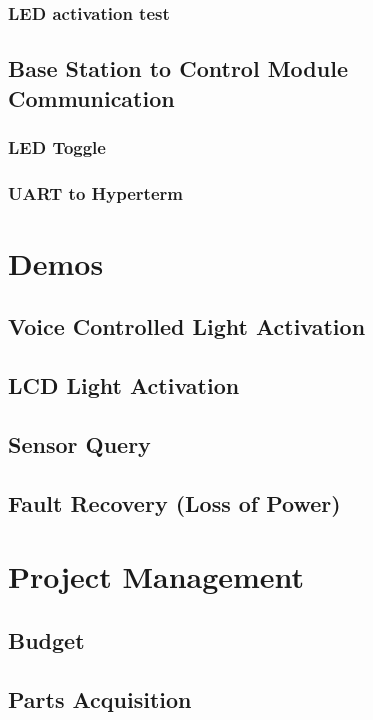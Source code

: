   \subsubsection{LED activation test}
\lipsum[1]
 \subsection{Base Station to Control Module Communication}
\lipsum[1]
  \subsubsection{LED Toggle}
\lipsum[1]
  \subsubsection{UART to Hyperterm}
\lipsum[1]
\section{Demos}
\lipsum[1]
 \subsection{Voice Controlled Light Activation}
\lipsum[1]
 \subsection{LCD Light Activation}
\lipsum[1]
 \subsection{Sensor Query}
\lipsum[1]
 \subsection{Fault Recovery (Loss of Power)}
\lipsum[1]
\section{Project Management}
\lipsum[1]
 \subsection{Budget}
\lipsum[1]
 \subsection{Parts Acquisition}
\lipsum[1]
